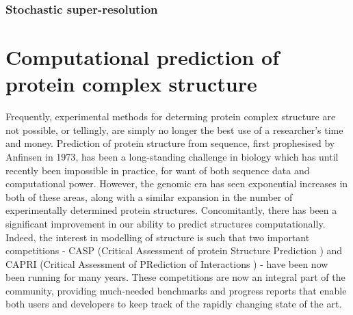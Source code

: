 \documentclass[a4paper,11pt,twoside,openright]{scrbook}
\begin{document}
\subsubsection{Stochastic super-resolution}

\section{Computational prediction of protein complex structure}
Frequently, experimental methods for determing protein complex structure are not possible, or tellingly, are simply no longer the best use of a researcher's time and money. Prediction of protein structure from sequence, first prophesised by Anfinsen in 1973\cite{Anfinsen1973}, has been a long-standing challenge in biology which has until recently been impossible in practice, for want of both sequence data and computational power. However, the genomic era has seen exponential increases in both of these areas, along with a similar expansion in the number of experimentally determined protein structures. Concomitantly, there has been a significant improvement in our ability to predict structures computationally. Indeed, the interest in modelling of structure is such that two important competitions - CASP (Critical Assessment of protein Structure Prediction \cite{Moult1995}) and CAPRI (Critical Assessment of PRediction of Interactions \cite{Janin2003}) - have been now been running for many years. These competitions are now an integral part of the community, providing much-needed benchmarks and progress reports that enable both users and developers to keep track of the rapidly changing state of the art.
\end{document}
